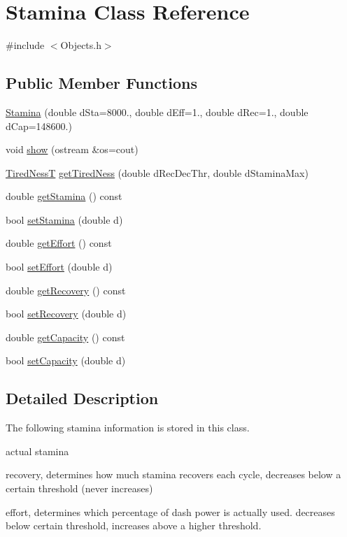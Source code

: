 \hypertarget{classStamina}{}\section{Stamina Class Reference}
\label{classStamina}


{\ttfamily \#include $<$Objects.\+h$>$}

\subsection*{Public Member Functions}
\begin{DoxyCompactItemize}
\item 
\hyperlink{classStamina_a45b52edec2994ff8afd70c936cd13ccd}{Stamina} (double d\+Sta=8000., double d\+Eff=1., double d\+Rec=1., double d\+Cap=148600.)
\item 
void \hyperlink{classStamina_a24938282788d0242b0d2db556dcb523b}{show} (ostream \&os=cout)
\item 
\hyperlink{SoccerTypes_8h_a30c890a1436546403a8d03667c70a94d}{Tired\+NessT} \hyperlink{classStamina_a70ba7752675e7912c0a28ca6e7978398}{get\+Tired\+Ness} (double d\+Rec\+Dec\+Thr, double d\+Stamina\+Max)
\item 
double \hyperlink{classStamina_ab0bf2378d7e8c4cd6164324102a08a55}{get\+Stamina} () const 
\item 
bool \hyperlink{classStamina_ac04ba8774a98922c75863d5f0316c373}{set\+Stamina} (double d)
\item 
double \hyperlink{classStamina_aed2dda088313aa63f3d97580dea17c77}{get\+Effort} () const 
\item 
bool \hyperlink{classStamina_ab7397c2d51bef75bedc2dda30c0ea7ea}{set\+Effort} (double d)
\item 
double \hyperlink{classStamina_a7c760ef0e4c65a0a1387768bff9231bd}{get\+Recovery} () const 
\item 
bool \hyperlink{classStamina_a462ff8ac255df34391b5f3e134041647}{set\+Recovery} (double d)
\item 
double \hyperlink{classStamina_a9bb38ed79912ca5aeeccfaf0d44742ce}{get\+Capacity} () const 
\item 
bool \hyperlink{classStamina_ae988a10cce8a1332af97aa366cf22ecb}{set\+Capacity} (double d)
\end{DoxyCompactItemize}


\subsection{Detailed Description}
The following stamina information is stored in this class.
\begin{DoxyItemize}
\item actual stamina
\item recovery, determines how much stamina recovers each cycle, decreases below a certain threshold (never increases)
\item effort, determines which percentage of dash power is actually used. decreases below certain threshold, increases above a higher threshold. 
\end{DoxyItemize}

